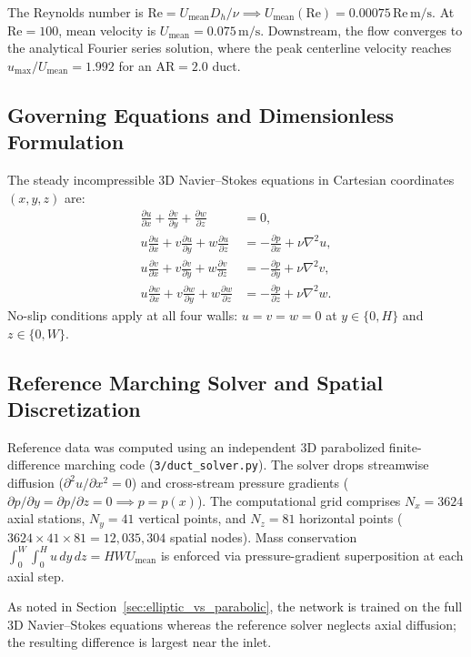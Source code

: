 \documentclass[11pt,a4paper]{article}
\begin{document}
The Reynolds number is $\mathrm{Re} = U_{\mathrm{mean}} D_h / \nu \implies U_{\mathrm{mean}}(\mathrm{Re}) = 0.00075\,\mathrm{Re}\,\text{m/s}$. At $\mathrm{Re}=100$, mean velocity is $U_{\mathrm{mean}} = 0.075\,\text{m/s}$. Downstream, the flow converges to the analytical Fourier series solution, where the peak centerline velocity reaches $u_{\max}/U_{\mathrm{mean}} = 1.992$ for an $\mathrm{AR}=2.0$ duct.

\subsection{Governing Equations and Dimensionless Formulation}
The steady incompressible 3D Navier--Stokes equations in Cartesian coordinates $(x, y, z)$ are:
\begin{align}
\frac{\partial u}{\partial x} + \frac{\partial v}{\partial y} + \frac{\partial w}{\partial z} &= 0, \\
u \frac{\partial u}{\partial x} + v \frac{\partial u}{\partial y} + w \frac{\partial u}{\partial z} &= -\frac{\partial p}{\partial x} + \nu \nabla^2 u, \\
u \frac{\partial v}{\partial x} + v \frac{\partial v}{\partial y} + w \frac{\partial v}{\partial z} &= -\frac{\partial p}{\partial y} + \nu \nabla^2 v, \\
u \frac{\partial w}{\partial x} + v \frac{\partial w}{\partial y} + w \frac{\partial w}{\partial z} &= -\frac{\partial p}{\partial z} + \nu \nabla^2 w.
\end{align}
No-slip conditions apply at all four walls: $u=v=w=0$ at $y \in \{0, H\}$ and $z \in \{0, W\}$.

\subsection{Reference Marching Solver and Spatial Discretization}
Reference data was computed using an independent 3D parabolized finite-difference marching code (\texttt{3/duct\_solver.py}). The solver drops streamwise diffusion ($\partial^2 u/\partial x^2 = 0$) and cross-stream pressure gradients ($\partial p/\partial y = \partial p/\partial z = 0 \implies p = p(x)$). The computational grid comprises $N_x = 3624$ axial stations, $N_y = 41$ vertical points, and $N_z = 81$ horizontal points ($3624 \times 41 \times 81 = 12{,}035{,}304$ spatial nodes). Mass conservation $\int_0^W \int_0^H u\,dy\,dz = H W U_{\mathrm{mean}}$ is enforced via pressure-gradient superposition at each axial step.

As noted in Section~\ref{sec:elliptic_vs_parabolic}, the network is trained on the full 3D Navier--Stokes equations whereas the reference solver neglects axial diffusion; the resulting difference is largest near the inlet.
\end{document}
